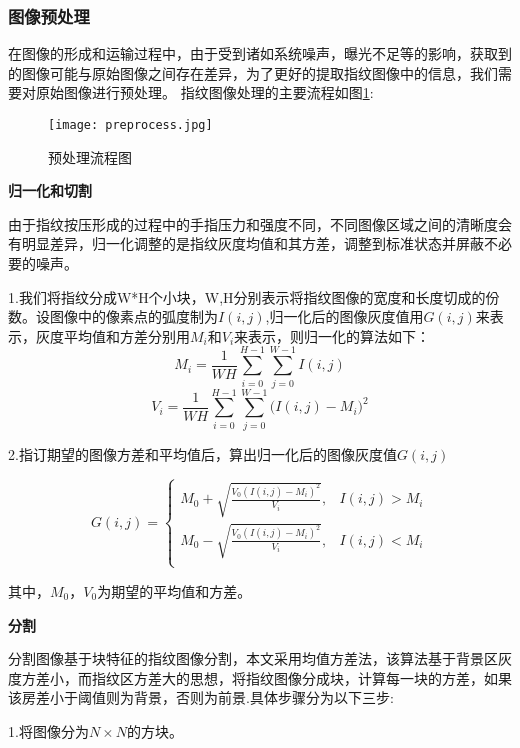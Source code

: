 \documentclass[withoutpreface,bwprint]{cumcmthesis} %
\begin{document}
\subsubsection{图像预处理}
在图像的形成和运输过程中，由于受到诸如系统噪声，曝光不足等的影响，获取到的图像可能与原始图像之间存在差异，为了更好的提取指纹图像中的信息，我们需要对原始图像进行预处理。
指纹图像处理的主要流程如图\ref{fig:preprocess}:
\begin{figure}[!h]
	\centering
	\texttt{[image: preprocess.jpg]}
	\caption{预处理流程图}
	\label{fig:preprocess}
\end{figure}

\textbf{归一化和切割}

由于指纹按压形成的过程中的手指压力和强度不同，不同图像区域之间的清晰度会有明显差异，归一化调整的是指纹灰度均值和其方差，调整到标准状态并屏蔽不必要的噪声。\par
1.我们将指纹分成W*H个小块，W,H分别表示将指纹图像的宽度和长度切成的份数。设图像中的像素点的弧度制为$I(i,j)$,归一化后的图像灰度值用$G(i,j)$来表示，灰度平均值和方差分别用$M_{i}$和$V_{i}$来表示，则归一化的算法如下：
\begin{equation}
M_{i}=\frac1{WH}\sum_{i=0}^{H-1}\sum_{j=0}^{W-1}I(i,j)
\end{equation}
\begin{equation}
V_{i}=\frac1{WH}\sum_{i=0}^{H-1}\sum_{j=0}^{W-1}({I(i,j)-M_{i})^2}
\end{equation}

2.指订期望的图像方差和平均值后，算出归一化后的图像灰度值$G(i,j)$\par

\begin{equation}
G(i,j)=
\begin{cases}
M_{0}+\sqrt{\frac{V_{0}\left(I(i, j)-M_{i}\right)^{2}}{V_{i}}},& I(i,j)>M_{i}\\
M_{0}-\sqrt{\frac{V_{0}\left(I(i, j)-M_{i}\right)^{2}}{V_{i}}},& I(i,j)<M_{i}\\
\end{cases}
\end{equation}


其中，$M_{0}$，$V_{0}$为期望的平均值和方差。\par

\textbf{分割}

分割图像基于块特征的指纹图像分割，本文采用均值方差法，该算法基于背景区灰度方差小，而指纹区方差大的思想，将指纹图像分成块，计算每一块的方差，如果该房差小于阈值则为背景，否则为前景.具体步骤分为以下三步:\par
1.将图像分为$N×N$的方块。
\end{document}
